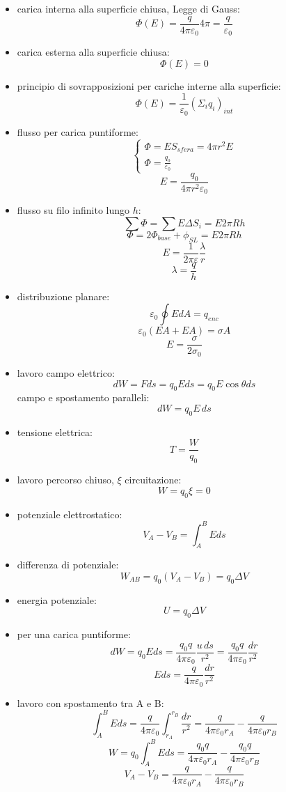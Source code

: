 \documentclass[a4paper,12pt, oneside]{book}
\begin{document}
\begin{itemize}
	\item carica interna alla superficie chiusa, Legge di Gauss:
	      $$\Phi(E)=\frac{q}{4\pi\varepsilon_0}4\pi=\frac{q}{\varepsilon_0}$$
	\item carica esterna alla superficie chiusa:
	      $$\Phi(E)=0$$
	\item principio di sovrapposizioni per cariche interne alla superficie:
	      $$\Phi(E)=\frac{1}{\varepsilon_0}(\Sigma_iq_i)_{int}$$
	\item flusso per carica puntiforme:
	      $$\begin{cases}
			      \Phi=ES_{sfera}=4\pi r^2 E \\
			      \Phi=\frac{q_0}{\varepsilon_0}
		      \end{cases}
	      $$
	      $$E=\frac{q_0}{4\pi r^2 \varepsilon_0}$$
	\item flusso su filo infinito lungo $h$:
	      $$\sum \Phi=\sum E\Delta S_i=E2\pi Rh$$
	      $$\Phi=2\Phi_{base}+\phi_{SL}=E2\pi Rh$$
	      $$E=\frac{1}{2\pi\varepsilon}\frac{\lambda}{r}$$
	      $$\lambda=\frac{q}{h}$$
	\item distribuzione planare:
	      $$\varepsilon_0\oint EdA=q_{enc}$$
	      $$\varepsilon_0(EA+EA)=\sigma A$$
	      $$E=\frac{\sigma}{2\sigma_0}$$
	\item lavoro campo elettrico:
	      $$dW=Fds=q_0Eds=q_0E\cos \theta ds$$
	      campo e spostamento paralleli:
	      $$dW=q_0E\,ds$$
	\item tensione elettrica:
	      $$T=\frac{W}{q_0}$$
	\item lavoro percorso chiuso, $\xi$ circuitazione:
	      $$W=q_0\xi=0$$
	\item potenziale elettrostatico:
	      $$V_A-V_B=\int_A^B Eds$$
	\item differenza di potenziale:
	      $$W_{AB}=q_0(V_A-V_B)=q_0\Delta V$$
	\item energia potenziale:
	      $$U=q_0\Delta V$$
	\item per una carica puntiforme:
	      $$dW=q_0Eds=\frac{q_0q}{4\pi\varepsilon_0}\frac{u\,ds}{r^2}=\frac{q_0q}{4\pi\varepsilon_0}\frac{dr}{r^2}$$
	      $$Eds=\frac{q}{4\pi\varepsilon_0}\frac{dr}{r^2}$$
	\item lavoro con spostamento tra A e B:
	      $$\int_A^B Eds=\frac{q}{4\pi\varepsilon_0}\int_{r_A}^{r_B}\frac{dr}{r^2}=\frac{q}{4\pi\varepsilon_0r_A}-\frac{q}{4\pi\varepsilon_0r_B}$$
	      $$W=q_0\int_A^B Eds=\frac{q_0q}{4\pi\varepsilon_0r_A}-\frac{q_0q}{4\pi\varepsilon_0r_B}$$
	      $$V_A-V_B=\frac{q}{4\pi\varepsilon_0r_A}-\frac{q}{4\pi\varepsilon_0r_B}$$

\end{itemize}
\end{document}
